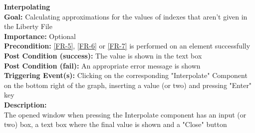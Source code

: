 \documentclass[10pt,a4paper]{report}
\newcommand{\precondition}[1]{
    \textbf{Precondition: } #1 \leavevmode \\
}
\newcommand{\FRODescription}[8]{
    \textbf{#1} \leavevmode \\
    \textbf{Goal: } #2 \leavevmode \\
    \textbf{Importance: } #3 \leavevmode \\
    \precondition{#4}
    \textbf{Post Condition (success): } #5 \leavevmode \\
    \textbf{Post Condition (fail): } #6 \leavevmode \\
    \textbf{Triggering Event(s): } #7 \leavevmode \\
    \textbf{Description: } \leavevmode \\
    #8}
\begin{document}
\begin{FRO}
{\begin{itemize}
    \end{itemize}}
    \item \FRODescription{Interpolating\label{FRO-16}}
    {Calculating approximations for the values of indexes that aren't given in the Liberty File}
    {Optional}
    {\ref{FR-5}, \ref{FR-6} or \ref{FR-7} is performed on an element successfully}
    {The value is shown in the text box}
    {An appropriate error message is shown}
    {Clicking on the corresponding "Interpolate" Component on the bottom right of the graph, inserting a value (or two) and pressing "Enter" key}
    {The opened window when pressing the Interpolate component has an input (or two) box, a text box where the final value is shown and a "Close" button}

\end{FRO}
\end{document}
